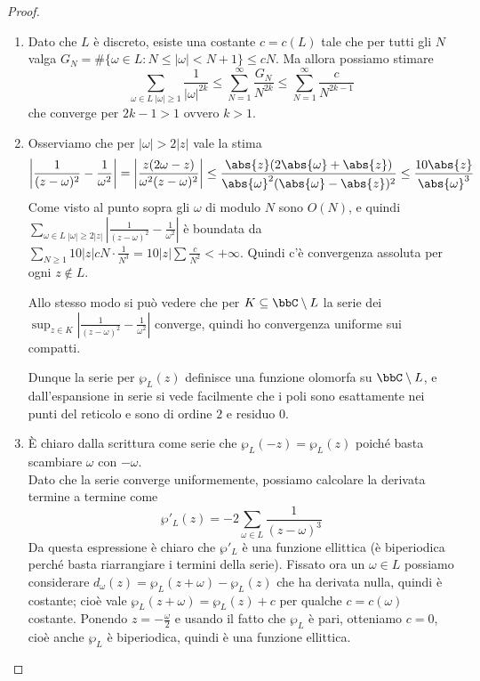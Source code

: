\begin{proof}$ $
    \begin{enumerate}
        \item Dato che $L$ è discreto, esiste una costante $c=c(L)$ tale che per tutti gli $N$ valga $G_N=\#\{\omega\in L : N\le |\omega|<N+1\}\le cN$. Ma allora possiamo stimare $$\sum_{\omega\in L\ |\omega|\ge1}\dfrac1{|\omega|^{2k}}\le \sum_{N=1}^\infty \dfrac{G_N}{N^{2k}}\le \sum_{N=1}^\infty \dfrac{c}{N^{2k-1}}$$ che converge per $2k-1>1$ ovvero $k>1$.

        \item Osserviamo che per $|\omega|>2|z|$ vale la stima $$ \left|\frac{1}{(z-\omega)^2}-\frac{1}{\omega^2}\right| = \left|\frac{z(2\omega-z)}{\omega^2(z-\omega)^2}\right| \le \frac{\abs{z}(2\abs{\omega}+\abs{z})}{\abs{\omega}^2(\abs{\omega}-\abs{z})^2} \le \frac{10\abs{z}}{\abs{\omega}^3} $$
        Come visto al punto sopra gli $\omega$ di modulo $N$ sono $O(N)$, e quindi $\displaystyle\sum_{\omega\in L\ |\omega|\ge2|z|}\left|\frac{1}{(z-\omega)^2}-\frac{1}{\omega^2}\right|$ è boundata da $\sum_{N\ge1} 10|z|cN\cdot\frac{1}{N^3}=10|z|\sum\frac{c}{N^2}<+\infty$. Quindi c'è convergenza assoluta per ogni $z\not\in L$.

        Allo stesso modo si può vedere che per $K\subseteq\bbC\setminus L$ la serie dei  $\sup_{z\in K}\left|\frac{1}{(z-\omega)^2}-\frac{1}{\omega^2}\right|$ converge, quindi ho convergenza uniforme sui compatti.

        Dunque la serie per $\wp_L(z)$ definisce una funzione olomorfa su $\bbC\setminus L$, e dall'espansione in serie si vede facilmente che i poli sono esattamente nei punti del reticolo e sono di ordine $2$ e residuo $0$.

        \item È chiaro dalla scrittura come serie che $\wp_L(-z)=\wp_L(z)$ poiché basta scambiare $\omega$ con $-\omega$.\\
        Dato che la serie converge uniformemente, possiamo calcolare la derivata termine a termine come $$ \wp'_L(z)=-2\sum_{\omega\in L}\frac1{(z-\omega)^3} $$
        Da questa espressione è chiaro che $\wp'_L$ è una funzione ellittica (è biperiodica perché basta riarrangiare i termini della serie). Fissato ora un $\omega\in L$ possiamo considerare $d_\omega(z)=\wp_L(z+\omega)-\wp_L(z)$ che ha derivata nulla, quindi è costante; cioè vale $\wp_L(z+\omega)=\wp_L(z)+c$ per qualche $c=c(\omega)$ costante. Ponendo $z=-\frac\omega2$ e usando il fatto che $\wp_L$ è pari, otteniamo $c=0$, cioè anche $\wp_L$ è biperiodica, quindi è una funzione ellittica.
    \end{enumerate}
\end{proof}

